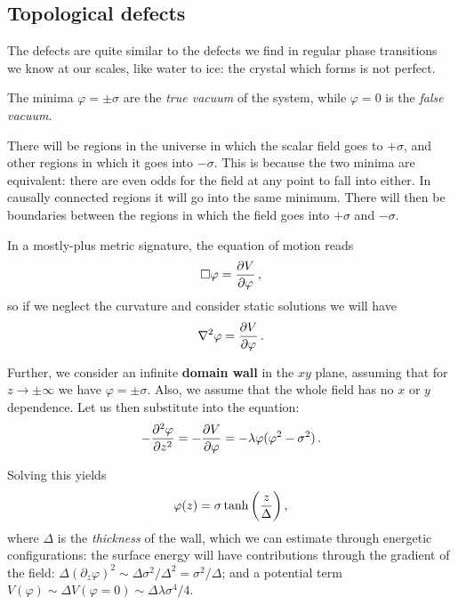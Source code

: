 \documentclass[main.tex]{subfiles}
\begin{document}
\subsection{Topological defects}

The defects are quite similar to the defects we find in regular phase transitions we know at our scales, like water to ice: the crystal which forms is not perfect. 

The minima \(\varphi = \pm \sigma \) are the \emph{true vacuum} of the system, while \(\varphi = 0\) is the \emph{false vacuum}. 

There will be regions in the universe in which the scalar field goes to \(+ \sigma \), and other regions in which it goes into \(- \sigma \). 
This is because the two minima are equivalent: there are even odds for the field at any point to fall into either. In causally connected regions it will go into the same minimum. 
There will then be boundaries between the regions in which the field goes into \(+ \sigma \) and \(- \sigma \).

In a mostly-plus metric signature, the equation of motion reads 
%
\begin{align}
\square \varphi = \pdv{V}{\varphi }
\,,
\end{align}
%
so if we neglect the curvature and consider static solutions we will have 
%
\begin{align}
\nabla^2 \varphi = \pdv{V}{\varphi }
\,.
\end{align}


Further, we consider an infinite \textbf{domain wall} in the \(xy\) plane, assuming that for \(z \to \pm \infty \) we have \(\varphi = \pm \sigma \). Also, we assume that the whole field has no \(x\) or \(y\) dependence.  
Let us then substitute into the equation: 
%
\begin{align}
- \pdv[2]{\varphi }{z} = - \pdv{V}{\varphi } = - \lambda \varphi (\varphi^2 - \sigma^2)
\,.
\end{align}

Solving this yields 
%
\begin{align}
\varphi (z) = \sigma \tanh \qty( \frac{z}{\Delta })
\,,
\end{align}
%
where \(\Delta \) is the \emph{thickness} of the wall, which we can estimate through energetic configurations: the surface energy will have contributions through the gradient of the field: \( \Delta (\partial_{z} \varphi)^2 \sim \Delta \sigma^2 / \Delta^2 = \sigma^2 / \Delta  \); and a potential term \(V(\varphi ) \sim \Delta V(\varphi =0) \sim \Delta \lambda \sigma^{4} / 4\). 
\end{document}
